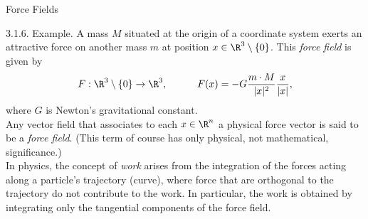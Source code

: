 \documentclass[smaller,hyperref={CJKbookmarks=true}]{beamer}
\begin{document}
\begin{frame}[t]{Force Fields}
\begin{spacing}{1.05}
\alert{3.1.6. Example.} A mass $M$ situated at the origin of a coordinate system exerts an attractive force on another mass $m$ at position $x\in\R^3\setminus\{0\}$. This \emph{force field} is given by
\setcounter{equation}{0}
\begin{equation}\label{3.1.1}
F:\R^3\setminus\{0\}\to\R^3,\qquad\quad
F(x)=-G\frac{m\cdot M}{|x|^2}\frac{x}{|x|},
\end{equation}
where $G$ is Newton's gravitational constant.\\[5pt]
Any vector field that associates to each $x\in\R^n$ a physical force vector is said to be a \emph{force field}. (This term of course has only physical, not
mathematical, significance.)\\[5pt]
In physics, the concept of \emph{work} arises from the integration of the forces
acting along a particle's trajectory (curve), where force that are orthogonal
to the trajectory do not contribute to the work. In particular, the work is
obtained by integrating only the tangential components of the force field.
\end{spacing}
\end{frame}
\end{document}
